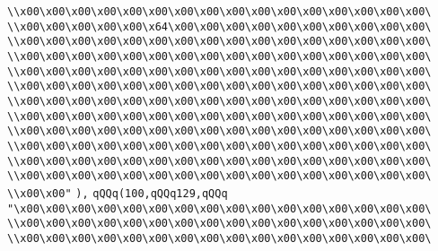 \verb|\\x00\x00\x00\x00\x00\x00\x00\x00\x00\x00\x00\x00\x00\x00\x00\x00\|\newline
\verb|\\x00\x00\x00\x00\x00\x64\x00\x00\x00\x00\x00\x00\x00\x00\x00\x00\|\newline
\verb|\\x00\x00\x00\x00\x00\x00\x00\x00\x00\x00\x00\x00\x00\x00\x00\x00\|\newline
\verb|\\x00\x00\x00\x00\x00\x00\x00\x00\x00\x00\x00\x00\x00\x00\x00\x00\|\newline
\verb|\\x00\x00\x00\x00\x00\x00\x00\x00\x00\x00\x00\x00\x00\x00\x00\x00\|\newline
\verb|\\x00\x00\x00\x00\x00\x00\x00\x00\x00\x00\x00\x00\x00\x00\x00\x00\|\newline
\verb|\\x00\x00\x00\x00\x00\x00\x00\x00\x00\x00\x00\x00\x00\x00\x00\x00\|\newline
\verb|\\x00\x00\x00\x00\x00\x00\x00\x00\x00\x00\x00\x00\x00\x00\x00\x00\|\newline
\verb|\\x00\x00\x00\x00\x00\x00\x00\x00\x00\x00\x00\x00\x00\x00\x00\x00\|\newline
\verb|\\x00\x00\x00\x00\x00\x00\x00\x00\x00\x00\x00\x00\x00\x00\x00\x00\|\newline
\verb|\\x00\x00\x00\x00\x00\x00\x00\x00\x00\x00\x00\x00\x00\x00\x00\x00\|\newline
\verb|\\x00\x00\x00\x00\x00\x00\x00\x00\x00\x00\x00\x00\x00\x00\x00\x00\|\newline
\verb|\\x00\x00"|\newline
\verb|),|\newline
\verb|qQQq(100,qQQq129,qQQq|\newline
\verb|"\x00\x00\x00\x00\x00\x00\x00\x00\x00\x00\x00\x00\x00\x00\x00\x00\|\newline
\verb|\\x00\x00\x00\x00\x00\x00\x00\x00\x00\x00\x00\x00\x00\x00\x00\x00\|\newline
\verb|\\x00\x00\x00\x00\x00\x00\x00\x00\x00\x00\x00\x00\x00\x00\x00\x00\|\newline
